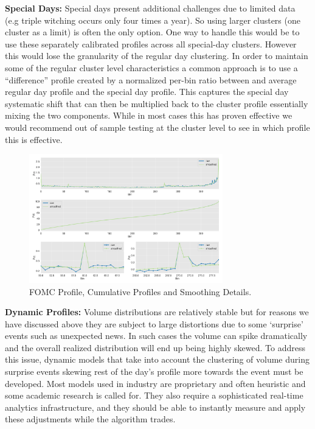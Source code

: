 \noindent\textbf{Special Days:} Special days present additional challenges due to limited data (e.g triple witching occurs only four times a year). So using larger clusters (one cluster as a limit) is often the only option. One way to handle this would be to use these separately calibrated profiles across all special-day clusters. However this would lose the granularity of the regular day clustering. In order to maintain some of the  regular cluster level characteristics a common approach is to use a ``difference'' profile created by a normalized per-bin ratio between and average regular day profile and the special day profile. This captures the special day systematic shift that can then be multiplied back to the cluster profile essentially mixing the two components. While in most cases this has proven effective we would recommend out of sample testing at the cluster level to see in which profile this is effective. 

	\begin{figure}[!ht]
	\centering
	\includegraphics[width=0.75\textwidth]{chapters/chapter_trade_data_models/figures/fomc_profile.png} 
	\caption{FOMC Profile, Cumulative Profiles and Smoothing Details. \label{fig:adv}}
\end{figure}


\noindent\textbf{Dynamic Profiles:} Volume distributions are relatively stable but for reasons we have discussed above they are subject to large distortions due to some `surprise' events such as unexpected news. In such cases the volume can spike dramatically and the overall realized distribution will end up being highly skewed. To address this issue, dynamic models that take into account the clustering of volume during surprise events skewing rest of the day's profile more towards the event must be developed. Most models used in industry are proprietary and often heuristic and some academic research is called for. They also require a sophisticated real-time analytics infrastructure, and they should be able to instantly measure and apply these adjustments while the algorithm trades.



